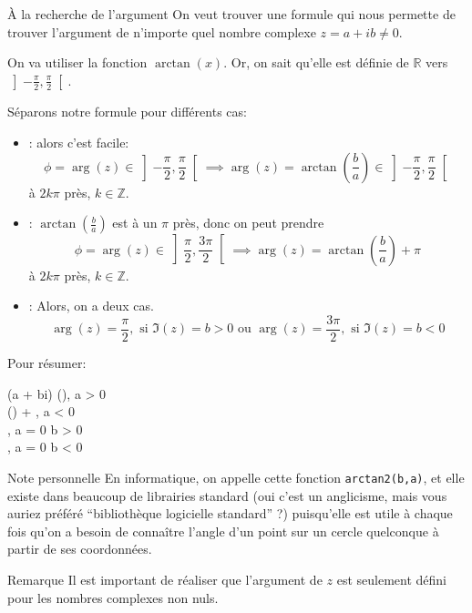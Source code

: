 \documentclass{article}
\begin{document}
\begin{parag}{À la recherche de l'argument}
    On veut trouver une formule qui nous permette de trouver l'argument de n'importe quel nombre complexe $z = a + ib \neq 0$.

    On va utiliser la fonction $\arctan\left(x\right)$. Or, on sait qu'elle est définie de $\mathbb{R}$ vers $\left]-\frac{\pi}{2}, \frac{\pi}{2}\right[ $.

    Séparons notre formule pour différents cas:
    \begin{itemize}
        \item {}: alors c'est facile:
            \[\phi = \arg\left(z\right) \in \left]-\frac{\pi}{2}, \frac{\pi}{2}\right[ \implies \arg\left(z\right) = \arctan\left(\frac{b}{a}\right) \in \left] -\frac{\pi}{2}, \frac{\pi}{2}\right[ \]
            à $2k\pi$ près, $k \in \mathbb{Z}$.

        \item {}: $\arctan\left(\frac{b}{a}\right)$ est à un $\pi$ près, donc on peut prendre
            \[\phi = \arg\left(z\right) \in \left] \frac{\pi}{2}, \frac{3\pi}{2}\right[ \implies \arg\left(z\right) = \arctan\left(\frac{b}{a}\right) + \pi\]
            à $2k\pi$ près, $k \in \mathbb{Z}$.
        \item {}: Alors, on a deux cas.
            \[\arg\left(z\right) = \frac{\pi}{2}, \text{ si } \Im\left(z\right) = b > 0 \text{ ou } \arg\left(z\right) = \frac{3\pi}{2}, \text{ si } \Im\left(z\right) = b < 0\]

    \end{itemize}

    Pour résumer:
    \begin{functionbypart}{\arg\left(a + bi\right)}
        \arctan\left(\right), \mathspace {} a > 0 \\
        \arctan\left(\right) + \pi, \mathspace {} a < 0 \\
        , \mathspace {} a = 0  b > 0 \\
        , \mathspace {} a = 0  b < 0
    \end{functionbypart}

    \begin{subparag}{Note personnelle}
        En informatique, on appelle cette fonction \texttt{arctan2(b,a)}, et elle existe dans beaucoup de librairies standard (oui c'est un anglicisme, mais vous auriez préféré ``bibliothèque logicielle standard'' ?) puisqu'elle est utile à chaque fois qu'on a besoin de connaître l'angle d'un point sur un cercle quelconque à partir de ses coordonnées.
    \end{subparag}

    \begin{subparag}{Remarque}
        Il est important de réaliser que l'argument de $z$ est seulement défini pour les nombres complexes non nuls.
    \end{subparag}
\end{parag}
\end{document}
